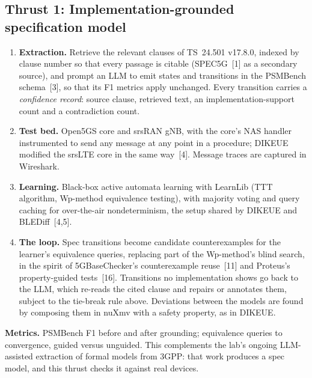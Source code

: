 \documentclass[11pt,letterpaper]{article}
\begin{document}
\subsection*{Thrust 1: Implementation-grounded specification model}
\begin{enumerate}
  \item \textbf{Extraction.} Retrieve the relevant clauses of TS~24.501 v17.8.0, indexed by clause number so that every passage is citable (SPEC5G~[1] as a secondary source), and prompt an LLM to emit states and transitions in the PSMBench schema~[3], so that its F1 metrics apply unchanged. Every transition carries a \emph{confidence record}: source clause, retrieved text, an implementation-support count and a contradiction count.
  \item \textbf{Test bed.} Open5GS core and srsRAN gNB, with the core's NAS handler instrumented to send any message at any point in a procedure; DIKEUE modified the srsLTE core in the same way~[4]. Message traces are captured in Wireshark.
  \item \textbf{Learning.} Black-box active automata learning with LearnLib (TTT algorithm, Wp-method equivalence testing), with majority voting and query caching for over-the-air nondeterminism, the setup shared by DIKEUE and BLEDiff~[4,5].
  \item \textbf{The loop.} Spec transitions become candidate counterexamples for the learner's equivalence queries, replacing part of the Wp-method's blind search, in the spirit of 5GBaseChecker's counterexample reuse~[11] and Proteus's property-guided tests~[16]. Transitions no implementation shows go back to the LLM, which re-reads the cited clause and repairs or annotates them, subject to the tie-break rule above. Deviations between the models are found by composing them in nuXmv with a safety property, as in DIKEUE.
\end{enumerate}
\textbf{Metrics.} PSMBench F1 before and after grounding; equivalence queries to convergence, guided versus unguided. This complements the lab's ongoing LLM-assisted extraction of formal models from 3GPP: that work produces a spec model, and this thrust checks it against real devices.
\end{document}
